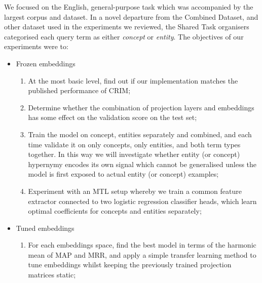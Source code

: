We focused on the English, general-purpose task which was accompanied by the largest corpus and dataset.  In a novel departure from the Combined Dataset, and other dataset used in the experiments we reviewed, the Shared Task organisers categorised each query term as either \textit{concept} or \textit{entity}.  The objectives of our experiments were to:
\begin{itemize}
    \item Frozen embeddings
    \begin{enumerate}
        \item At the most basic level, find out if our implementation matches the published performance of CRIM;
        \item Determine whether the combination of projection layers and embeddings has some effect on the validation score on the test set;
        \item Train the model on concept, entities separately and combined, and each time validate it on only concepts, only entities, and both term types together.  In this way we will investigate whether entity (or concept) hypernymy encodes its own signal which cannot be generalised unless the model is first exposed to actual entity (or concept) examples;
        \item Experiment with an \ac{MTL} setup whereby we train a common feature extractor connected to two logistic regression classifier heads, which learn optimal coefficients for concepts and entities separately;
    \end{enumerate}
    \item Tuned embeddings
    \begin{enumerate}
        \item For each embeddings space, find the best model in terms of the harmonic mean of \ac{MAP} and \ac{MRR}, and apply a simple transfer learning method to tune embeddings whilst keeping the previously trained projection matrices static;
    \end{enumerate}
\end{itemize}

